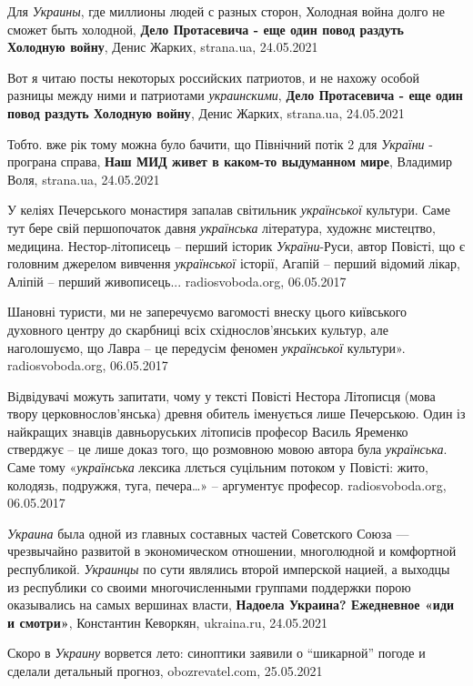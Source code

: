 Для \emph{Украины}, где миллионы людей с разных сторон, Холодная война долго не сможет быть холодной,
\textbf{Дело Протасевича - еще один повод раздуть Холодную войну}, Денис Жарких, strana.ua, 24.05.2021

Вот я читаю посты некоторых российских патриотов, и не нахожу особой разницы
между ними и патриотами \emph{украинскими},
\textbf{Дело Протасевича - еще один повод раздуть Холодную войну}, Денис Жарких, strana.ua, 24.05.2021

Тобто. вже рік тому можна було бачити, що Північний потік 2 для \emph{України}
- програна справа, \textbf{Наш МИД живет в каком-то выдуманном мире}, Владимир
Воля, strana.ua, 24.05.2021

У келіях Печерського монастиря запалав світильник \emph{української} культури. Саме
тут бере свій першопочаток давня \emph{українська} література, художнє мистецтво,
медицина. Нестор-літописець – перший історик \emph{України}-Руси, автор Повісті, що є
головним джерелом вивчення \emph{української} історії, Агапій – перший відомий лікар,
Аліпій – перший живописець...
radiosvoboda.org, 06.05.2017

Шановні туристи, ми не заперечуємо вагомості внеску цього київського духовного
центру до скарбниці всіх східнослов'янських культур, але наголошуємо, що Лавра
– це передусім феномен \emph{української} культури».
radiosvoboda.org, 06.05.2017

Відвідувачі можуть запитати, чому у тексті Повісті Нестора Літописця (мова
твору церковнослов'янська) древня обитель іменується лише Печерською. Один із
найкращих знавців давньоруських літописів професор Василь Яременко стверджує –
це лише доказ того, що розмовною мовою автора була \emph{українська}. Саме тому
«\emph{українська} лексика ллється суцільним потоком у Повісті: жито, колодязь,
подружжя, туга, печера…» – аргументує професор.
radiosvoboda.org, 06.05.2017

\emph{Украина} была одной из главных составных частей Советского Союза — чрезвычайно
развитой в экономическом отношении, многолюдной и комфортной республикой.
\emph{Украинцы} по сути являлись второй имперской нацией, а выходцы из республики со
своими многочисленными группами поддержки порою оказывались на самых вершинах
власти, \textbf{Надоела Украина? Ежедневное «иди и смотри»}, Константин Кеворкян, ukraina.ru, 24.05.2021

Скоро в \emph{Украину} ворвется лето: синоптики заявили о \enquote{шикарной} погоде и сделали детальный прогноз, obozrevatel.com,
25.05.2021

